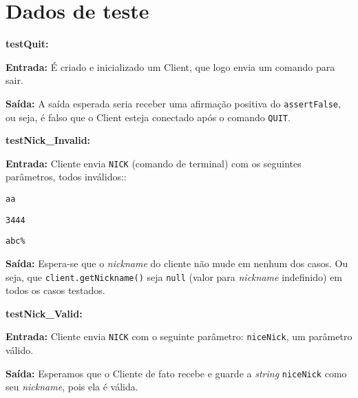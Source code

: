 \section{Dados de teste}

\newcommand{\teste}[3]{
    \item\textbf{#1:}
    \begin{itemise}
        \item\textbf{Entrada: } #2
        \item\textbf{Saída: }   #3
    \end{itemise}
}

\begin{itemise}
\teste
    {testQuit}
    {É criado e inicializado um Client, que logo envia um comando para sair.}
    {A saída esperada seria receber uma afirmação positiva do \texttt{assertFalse},
    ou seja, é falso que o Client esteja conectado após o comando \texttt{QUIT}.}
    
\teste
    {testNick\_Invalid}
    {Cliente envia \texttt{NICK} (comando de terminal) com os seguintes parâmetros,
    todos inválidos::
        \begin{itemise}
            \item \texttt{aa}
            \item \texttt{3444}
            \item \texttt{abc\%}
        \end{itemise}
    }
    {Espera-se que o \emph{nickname} do cliente não mude em nenhum dos casos. Ou
    seja, que \texttt{client.getNickname()} seja \texttt{null} (valor para
    \emph{nickname} indefinido) em todos os casos testados.}

\teste
    {testNick\_Valid}
    {Cliente envia \texttt{NICK} com o seguinte parâmetro: \texttt{niceNick}, um
    parâmetro válido.}
    {Esperamos que o Cliente de fato recebe e guarde a \emph{string}
    \texttt{niceNick} como seu \emph{nickname}, pois ela é válida.}



\end{itemise}
